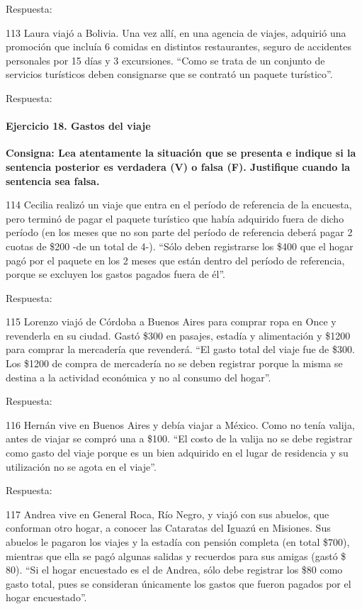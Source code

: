 \documentclass[
  openany]{book}
\begin{document}
Respuesta:

113 Laura viajó a Bolivia. Una vez allí, en una agencia de viajes, adquirió una promoción que incluía 6 comidas en distintos restaurantes, seguro de accidentes personales por 15 días y 3 excursiones. ``Como se trata de un conjunto de servicios turísticos deben consignarse que se contrató un paquete turístico''.

Respuesta:

\hypertarget{ejercicio-18.-gastos-del-viaje}{%
\paragraph{Ejercicio 18. Gastos del viaje}\label{ejercicio-18.-gastos-del-viaje}}

\textbf{Consigna: Lea atentamente la situación que se presenta e indique si la sentencia posterior es verdadera (V) o falsa (F). Justifique cuando la sentencia sea falsa.}

114 Cecilia realizó un viaje que entra en el período de referencia de la encuesta, pero terminó de pagar el paquete turístico que había adquirido fuera de dicho período (en los meses que no son parte del período de referencia deberá pagar 2 cuotas de \$200 -de un total de 4-). ``Sólo deben registrarse los \$400 que el hogar pagó por el paquete en los 2 meses que están dentro del período de referencia, porque se excluyen los gastos pagados fuera de él''.

Respuesta:

115 Lorenzo viajó de Córdoba a Buenos Aires para comprar ropa en Once y revenderla en su ciudad. Gastó \$300 en pasajes, estadía y alimentación y \$1200 para comprar la mercadería que revenderá. ``El gasto total del viaje fue de \$300. Los \$1200 de compra de mercadería no se deben registrar porque la misma se destina a la actividad económica y no al consumo del hogar''.

Respuesta:

116 Hernán vive en Buenos Aires y debía viajar a México. Como no tenía valija, antes de viajar se compró una a \$100. ``El costo de la valija no se debe registrar como gasto del viaje porque es un bien adquirido en el lugar de residencia y su utilización no se agota en el viaje''.

Respuesta:

117 Andrea vive en General Roca, Río Negro, y viajó con sus abuelos, que conforman otro hogar, a conocer las Cataratas del Iguazú en Misiones. Sus abuelos le pagaron los viajes y la estadía con pensión completa (en total \$700), mientras que ella se pagó algunas salidas y recuerdos para sus amigas (gastó \$ 80). ``Si el hogar encuestado es el de Andrea, sólo debe registrar los \$80 como gasto total, pues se consideran únicamente los gastos que fueron pagados por el hogar encuestado''.
\end{document}
